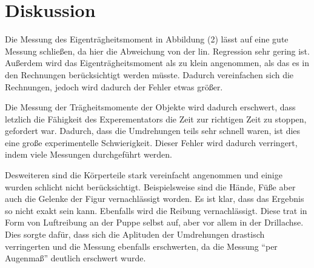 \section{Diskussion}
\label{sec:Diskussion}

Die Messung des Eigenträgheitsmoment in Abbildung (2) lässt auf eine gute Messung schließen,
da hier die Abweichung von der lin. Regression sehr gering ist.
Außerdem wird das Eigenträgheitsmoment als zu klein angenommen, als das es in den Rechnungen berücksichtigt werden müsste.
Dadurch vereinfachen sich die Rechnungen, jedoch wird dadurch der Fehler etwas größer.

Die Messung der Trägheitsmomente der Objekte wird dadurch erschwert, dass letzlich die Fähigkeit des Experementators die Zeit zur 
richtigen Zeit zu stoppen, gefordert war.
Dadurch, dass die Umdrehungen teils sehr schnell waren, ist dies eine große experimentelle Schwierigkeit.
Dieser Fehler wird dadurch verringert, indem viele Messungen durchgeführt werden.

Desweiteren sind die Körperteile stark vereinfacht angenommen und einige wurden schlicht nicht berücksichtigt.
Beispielsweise sind die Hände, Füße aber auch die Gelenke der Figur vernachlässigt worden.
Es ist klar, dass das Ergebnis so nicht exakt sein kann.
Ebenfalls wird die Reibung vernachlässigt.
Diese trat in Form von Luftreibung an der Puppe selbst auf, aber vor allem in der Drillachse.
Dies sorgte dafür, dass sich die Aplituden der Umdrehungen drastisch verringerten und die Messung ebenfalls erschwerten, da die
Messung \enquote{per Augenmaß} deutlich erschwert wurde.

\nocite{matplotlib}
\nocite{numpy}